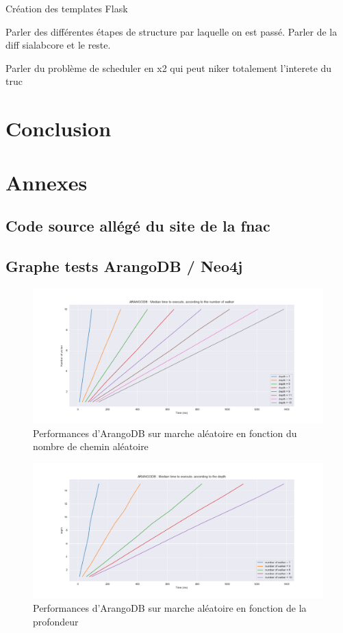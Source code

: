 \documentclass{article} %
\begin{document}
Création des templates Flask 

Parler des différentes étapes de structure par laquelle on est passé. Parler de la diff sialabcore et le reste.

Parler du problème de scheduler en x2 qui peut niker totalement l'interete du truc


\newpage


\section{Conclusion}
\newpage

\section{Annexes}
\subsection{Code source allégé du site de la fnac}
%
\subsection{Graphe tests ArangoDB / Neo4j}

\begin{figure}[!h]
	\centering
	\includegraphics[keepaspectratio = true,scale=0.4]{arangoDB_nbwalker_time.png}
	\caption{Performances d'ArangoDB sur marche aléatoire en fonction du nombre de chemin aléatoire}
	\label{fig:arwalk}
\end{figure}


\begin{figure}[!h]
	\centering
	\includegraphics[keepaspectratio = true,scale=0.4]{arangoDB_depth_time.png}
	\caption{Performances d'ArangoDB sur marche aléatoire en fonction de la profondeur}
	\label{fig:ardepth}
\end{figure}
\newpage
\end{document}
